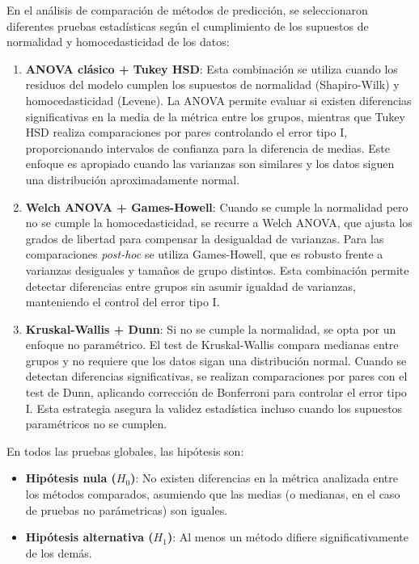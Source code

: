 En el análisis de comparación de métodos de predicción, se seleccionaron diferentes pruebas estadísticas según el cumplimiento de los supuestos de normalidad y homocedasticidad de los datos:

\begin{enumerate}

    \item \textbf{ANOVA clásico + Tukey HSD}: Esta combinación se utiliza cuando los residuos del modelo cumplen los supuestos de normalidad (Shapiro-Wilk) y homocedasticidad (Levene). La ANOVA permite evaluar si existen diferencias significativas en la media de la métrica entre los grupos, mientras que Tukey HSD realiza comparaciones por pares controlando el error tipo I, proporcionando intervalos de confianza para la diferencia de medias. Este enfoque es apropiado cuando las varianzas son similares y los datos siguen una distribución aproximadamente normal.
    
    \item \textbf{Welch ANOVA + Games-Howell}: Cuando se cumple la normalidad pero no se cumple la homocedasticidad, se recurre a Welch ANOVA, que ajusta los grados de libertad para compensar la desigualdad de varianzas. Para las comparaciones \textit{post-hoc} se utiliza Games-Howell, que es robusto frente a varianzas desiguales y tamaños de grupo distintos. Esta combinación permite detectar diferencias entre grupos sin asumir igualdad de varianzas, manteniendo el control del error tipo I.
    
    \item \textbf{Kruskal-Wallis + Dunn}: Si no se cumple la normalidad, se opta por un enfoque no paramétrico. El test de Kruskal-Wallis compara medianas entre grupos y no requiere que los datos sigan una distribución normal. Cuando se detectan diferencias significativas, se realizan comparaciones por pares con el test de Dunn, aplicando corrección de Bonferroni para controlar el error tipo I. Esta estrategia asegura la validez estadística incluso cuando los supuestos paramétricos no se cumplen.
    
\end{enumerate}

En todos las pruebas globales, las hipótesis son:

\begin{itemize}
    \item \textbf{Hipótesis nula ($H_0$)}: No existen diferencias en la métrica analizada entre los métodos comparados, asumiendo que las medias (o medianas, en el caso de pruebas no parámetricas) son iguales.
    \item \textbf{Hipótesis alternativa ($H_1$)}: Al menos un método difiere significativamente de los demás.
\end{itemize}



